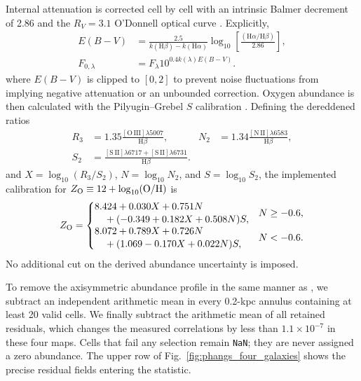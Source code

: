\documentclass[fleqn,usenatbib]{mnras}
\begin{document}
Internal attenuation is corrected cell by cell with an intrinsic Balmer decrement of 2.86 and the $R_V=3.1$ O'Donnell optical curve \citep{ODonnell1994}.  Explicitly,
\begin{equation}
    \begin{aligned}
    E(B-V)&=
    \frac{2.5}{k(\mathrm{H}\beta)-k(\mathrm{H}\alpha)}
    \log_{10}\left[\frac{(\mathrm{H}\alpha/\mathrm{H}\beta)}{2.86}\right],\\
    F_{0,\lambda}&=F_\lambda 10^{0.4k(\lambda)E(B-V)}.
    \end{aligned}
    \label{eq:phangs_reddening}
\end{equation}
where $E(B-V)$ is clipped to $[0,2]$ to prevent noise fluctuations from implying negative attenuation or an unbounded correction.  Oxygen abundance is then calculated with the Pilyugin--Grebel $S$ calibration \citep{PilyuginGrebel2016}.  Defining the dereddened ratios
\begin{equation}
    \begin{aligned}
    R_3&=1.35\frac{[\mathrm{O\,III}]\lambda5007}{\mathrm{H}\beta},
    &N_2&=1.34\frac{[\mathrm{N\,II}]\lambda6583}{\mathrm{H}\beta},\\
    S_2&=\frac{[\mathrm{S\,II}]\lambda6717
    +[\mathrm{S\,II}]\lambda6731}{\mathrm{H}\beta}.
    \end{aligned}
\end{equation}
and $X=\log_{10}(R_3/S_2)$, $N=\log_{10}N_2$, and $S=\log_{10}S_2$, the implemented calibration for $Z_{\rm O}\equiv12+\log_{10}(\mathrm{O/H})$ is
\begin{equation}
  Z_{\rm O}=
  \begin{cases}
  \begin{aligned}
  &8.424+0.030X+0.751N\\[-2pt]
  &\quad+(-0.349+0.182X+0.508N)S,
  \end{aligned}
  &N\geq-0.6,\\[4pt]
  \begin{aligned}
  &8.072+0.789X+0.726N\\[-2pt]
  &\quad+(1.069-0.170X+0.022N)S,
  \end{aligned}
  &N<-0.6.
  \end{cases}
  \label{eq:phangs_scalibration}
\end{equation}
No additional cut on the derived abundance uncertainty is imposed.

To remove the axisymmetric abundance profile in the same manner as \citet{Li2021}, we subtract an independent arithmetic mean in every 0.2-kpc annulus containing at least 20 valid cells.  We finally subtract the arithmetic mean of all retained residuals, which changes the measured correlations by less than $1.1\times10^{-7}$ in these four maps.  Cells that fail any selection remain \texttt{NaN}; they are never assigned a zero abundance.  The upper row of Fig.~\ref{fig:phangs_four_galaxies} shows the precise residual fields entering the statistic.
\end{document}
